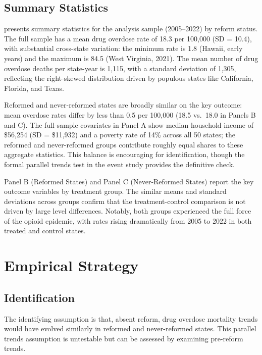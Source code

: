 \documentclass[12pt]{article}
\begin{document}
\subsection{Summary Statistics}

 presents summary statistics for the analysis sample (2005--2022) by reform status. The full sample has a mean drug overdose rate of 18.3 per 100,000 (SD = 10.4), with substantial cross-state variation: the minimum rate is 1.8 (Hawaii, early years) and the maximum is 84.5 (West Virginia, 2021). The mean number of drug overdose deaths per state-year is 1,115, with a standard deviation of 1,305, reflecting the right-skewed distribution driven by populous states like California, Florida, and Texas.

Reformed and never-reformed states are broadly similar on the key outcome: mean overdose rates differ by less than 0.5 per 100,000 (18.5 vs.\ 18.0 in Panels B and C). The full-sample covariates in Panel A show median household income of \$56,254 (SD = \$11,932) and a poverty rate of 14\% across all 50 states; the reformed and never-reformed groups contribute roughly equal shares to these aggregate statistics. This balance is encouraging for identification, though the formal parallel trends test in the event study provides the definitive check.

Panel B (Reformed States) and Panel C (Never-Reformed States) report the key outcome variables by treatment group. The similar means and standard deviations across groups confirm that the treatment-control comparison is not driven by large level differences. Notably, both groups experienced the full force of the opioid epidemic, with rates rising dramatically from 2005 to 2022 in both treated and control states.




\section{Empirical Strategy}
\label{sec:strategy}

\subsection{Identification}

The identifying assumption is that, absent reform, drug overdose mortality trends would have evolved similarly in reformed and never-reformed states. This parallel trends assumption is untestable but can be assessed by examining pre-reform trends.
\end{document}
